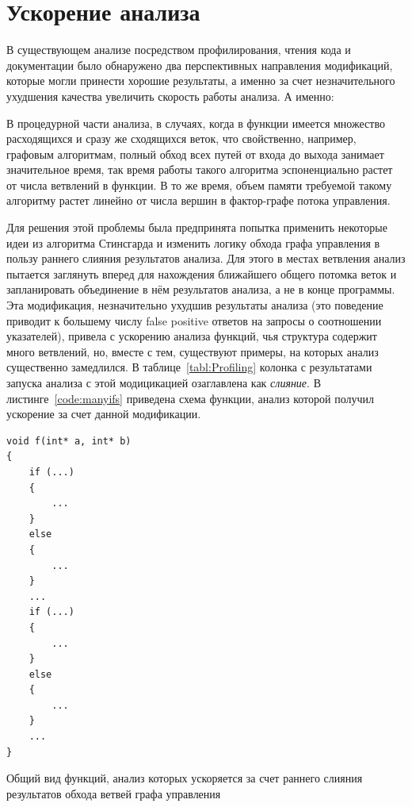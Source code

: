 \section{Ускорение анализа}

В существующем анализе посредством профилирования, чтения кода и документации было обнаружено два перспективных направления модификаций, которые могли принести хорошие результаты, а именно за счет незначительного ухудшения качества увеличить скорость работы анализа. А именно:

В процедурной части анализа, в случаях, когда в функции имеется множество расходящихся и сразу же сходящихся веток, что свойственно, например, графовым алгоритмам, полный обход всех путей от входа до выхода занимает значительное время, так время работы такого алгоритма эспоненциально растет от числа ветвлений в функции. В то же время, объем памяти требуемой такому алгоритму растет линейно от числа вершин в фактор-графе потока управления.

Для решения этой проблемы была предпринята попытка применить некоторые идеи из алгоритма Стинсгарда и изменить логику обхода графа управления в пользу раннего слияния результатов анализа. Для этого в местах ветвления анализ пытается заглянуть вперед для нахождения ближайшего общего потомка веток и запланировать объединение в нём результатов анализа, а не в конце программы. Эта модификация, незначительно ухудшив результаты анализа (это поведение приводит к большему числу false positive ответов на запросы о соотношении указателей), привела с ускорению анализа функций, чья структура содержит много ветвлений, но, вместе с тем, существуют примеры, на которых анализ существенно замедлился. В таблице~\ref{tabl:Profiling} колонка с результатами запуска анализа с этой модицикацией озаглавлена как \textit{слияние}. В листинге~\ref{code:manyifs} приведена схема функции, анализ которой получил ускорение за счет данной модификации.

\begin{ListingEnv}[ht]
\begin{lstlisting}
void f(int* a, int* b)
{
    if (...)
    {
        ...
    }
    else
    {
        ...
    }
    ...
    if (...)
    {
        ...
    }
    else
    {
        ...
    }
    ...
}
\end{lstlisting}
\caption{Общий вид функций, анализ которых ускоряется за счет раннего слияния результатов обхода ветвей графа управления}
\label{code:manyifs}
\end{ListingEnv}

